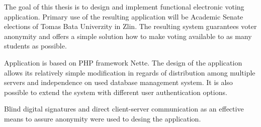 The goal of this thesis is to design and implement functional electronic voting application. Primary use of the resulting application will be Academic Senate elections of Tomas Bata Univerzity in Zlin. The resulting system guarantees voter anonymity and offers a simple solution how to make voting available to as many students as possible.

Application is based on PHP framework Nette. The design of the application allows its relatively simple modification in regards of distribution among multiple servers and independence on used database management system. It is also possible to extend the system with different user authentication options.

Blind digital signatures and direct client-server communication as an effective means to assure anonymity were used to desing the application.